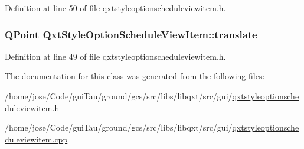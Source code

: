 Definition at line 50 of file qxtstyleoptionscheduleviewitem.\-h.

\hypertarget{class_qxt_style_option_schedule_view_item_a86c041ef9b13f9d7a8c26c28d78d2a48}{
\subsubsection[{translate}]{\setlength{\rightskip}{0pt plus 5cm}Q\-Point Qxt\-Style\-Option\-Schedule\-View\-Item\-::translate}}\label{class_qxt_style_option_schedule_view_item_a86c041ef9b13f9d7a8c26c28d78d2a48}


Definition at line 49 of file qxtstyleoptionscheduleviewitem.\-h.



The documentation for this class was generated from the following files\-:\begin{DoxyCompactItemize}
\item 
/home/jose/\-Code/gui\-Tau/ground/gcs/src/libs/libqxt/src/gui/\hyperlink{qxtstyleoptionscheduleviewitem_8h}{qxtstyleoptionscheduleviewitem.\-h}\item 
/home/jose/\-Code/gui\-Tau/ground/gcs/src/libs/libqxt/src/gui/\hyperlink{qxtstyleoptionscheduleviewitem_8cpp}{qxtstyleoptionscheduleviewitem.\-cpp}\end{DoxyCompactItemize}
